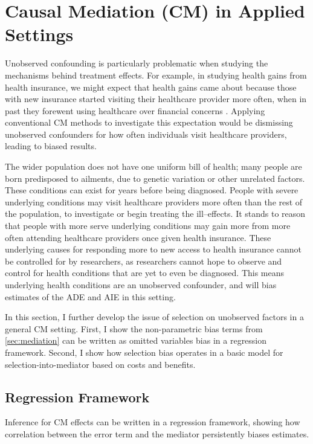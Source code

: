 \section{Causal Mediation (CM) in Applied Settings}
\label{sec:applied}
Unobserved confounding is particularly problematic when studying the mechanisms behind treatment effects.
For example, in studying health gains from health insurance, we might expect that health gains came about because those with new insurance started visiting their healthcare provider more often, when in past they forewent using healthcare over financial concerns \citep{finkelstein2008oregon}.
Applying conventional CM methods to investigate this expectation would be dismissing unobserved confounders for how often individuals visit healthcare providers, leading to biased results.

The wider population does not have one uniform bill of health; many people are born predisposed to ailments, due to genetic variation or other unrelated factors.
These conditions can exist for years before being diagnosed.
People with severe underlying conditions may visit healthcare providers more often than the rest of the population, to investigate or begin treating the ill--effects.
It stands to reason that people with more serve underlying conditions may gain more from more often attending healthcare providers once given health insurance.
These underlying causes for responding more to new access to health insurance cannot be controlled for by researchers, as researchers cannot hope to observe and control for health conditions that are yet to even be diagnosed.
This means underlying health conditions are an unobserved confounder, and will bias estimates of the ADE and AIE in this setting.

In this section, I further develop the issue of selection on unobserved factors in a general CM setting.
First, I show the non-parametric bias terms from \autoref{sec:mediation} can be written as omitted variables bias in a regression framework.
Second, I show how selection bias operates in a basic model for selection-into-mediator based on costs and benefits.

\subsection{Regression Framework}
\label{sec:regression}
Inference for CM effects can be written in a regression framework, showing how correlation between the error term and the mediator persistently biases estimates.

